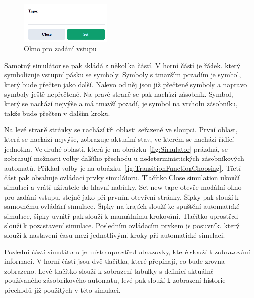 \begin{figure}[h]
    \centering
    \includegraphics[width=0.4\textwidth]{Figures/PrntScrn_UI_TapeInput.png}
    \caption{Okno pro zadání vstupu}\label{fig:TapeInput}
\end{figure}

Samotný simulátor se pak skládá z několika částí. V horní částí je řádek, který symbolizuje vstupní pásku se symboly. Symboly s tmavším pozadím je symbol, který bude přečten jako další. Nalevo od něj jsou již přečtené symboly a napravo symboly ještě nepřečtené. Na pravé straně se pak nachází zásobník. Symbol, který se nachází nejvýše a má tmavší pozadí, je symbol na vrcholu zásobníku, takže bude přečten v dalším kroku. 

Na levé straně stránky se nachází tři oblasti seřazené ve sloupci. První oblast, která se nachází nejvýše, zobrazuje aktuální stav, ve kterém se nachází řídící jednotka. Ve druhé oblasti, která je na obrázku~\ref{fig:Simulator} prázdná, se zobrazují možnosti volby dalšího přechodu u nedeterministických zásobníkových automatů. Příklad volby je na obrázku~\ref{fig:TransitionFunctionChoosing}. Třetí část pak obsahuje ovládací prvky simulátoru. Tlačítko Close simulation ukončí simulaci a vrátí uživatele do hlavní nabídky. Set new tape otevře modální okno pro zadání vstupu, stejně jako při prvním otevření stránky.
Šipky pak slouží k samotnému ovládání simulace. Šipky na krajích slouží ke spuštění automatické simulace, šipky uvnitř pak slouží k manuálnímu krokování. Tlačítko uprostřed slouží k pozastavení simulace. Posledním ovládacím prvkem je posuvník, který slouží k nastavení času mezi jednotlivými kroky při automatické simulaci.

Poslední částí simulátoru je místo uprostřed obrazovky, které slouží k zobrazování informací. V horní částí jsou dvě tlačítka, které přepínají, co bude zrovna zobrazeno. Levé tlačítko slouží k zobrazení tabulky s definicí aktuálně používaného zásobníkového automatu, levé pak slouží k zobrazení historie přechodů již použitých v této simulaci.


